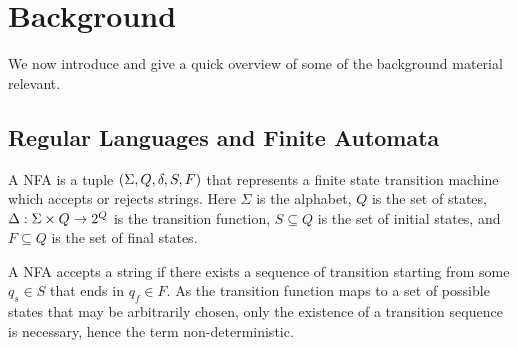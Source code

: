 
\section{Background}

We now introduce and give a quick overview of some of the background
material relevant.


\subsection{Regular Languages and Finite Automata}


A NFA is a tuple
\(\left(\Sigma, Q, \delta, S, F\right)\)
that represents a finite state transition machine
which accepts or rejects strings.
Here \(\Sigma\) is the alphabet,
\(Q\) is the set of states,
\(\Delta : \Sigma \times Q \to 2^{Q}\) is the transition function,
\(S \subseteq Q\) is the set of initial states,
and \(F \subseteq Q\) is the set of final states.

A NFA accepts a string if there exists a sequence of transition
starting from some \(q_s \in S\)
that ends in \(q_f \in F\).
As the transition function maps to a set of possible states that may
be arbitrarily chosen,
only the existence of a transition sequence is necessary,
hence the term non-deterministic.

